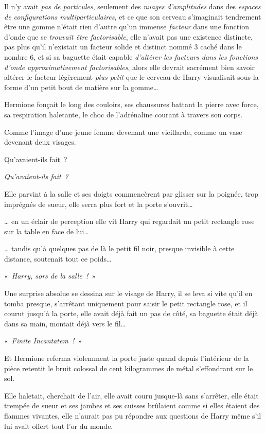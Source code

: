 Il n'y avait \emph{pas de particules}, seulement des \emph{nuages d'amplitudes} dans des \emph{espaces de configurations multiparticulaires}, et ce que son cerveau s'imaginait tendrement être une gomme n'était rien d'autre qu'un immense \emph{facteur} dans une fonction d'onde que se \emph{trouvait être factorisable}, elle n'avait pas une existence distincte, pas plus qu'il n'existait un facteur solide et distinct nommé 3 caché dans le nombre 6, et si sa baguette était capable \emph{d'altérer les facteurs dans les fonctions d'onde approximativement factorisables}, alors elle devrait sacrément bien savoir altérer le facteur légèrement \emph{plus petit} que le cerveau de Harry visualisait sous la forme d'un petit bout de matière sur la gomme…

\later

Hermione fonçait le long des couloirs, ses chaussures battant la pierre avec force, sa respiration haletante, le choc de l'adrénaline courant à travers son corps.

Comme l'image d'une jeune femme devenant une vieillarde, comme un vase devenant deux visages.

Qu'avaient-ils fait~?

\emph{Qu'avaient-ils fait~?}

Elle parvint à la salle et ses doigts commencèrent par glisser sur la poignée, trop imprégnés de sueur, elle serra plus fort et la porte s'ouvrit…

… en un éclair de perception elle vit Harry qui regardait un petit rectangle rose sur la table en face de lui…

… tandis qu'à quelques pas de là le petit fil noir, presque invisible à cette distance, soutenait tout ce poids…

«~\emph{Harry, sors de la salle~!}~»

Une surprise absolue se dessina sur le visage de Harry, il se leva si vite qu'il en tomba presque, s'arrêtant uniquement pour saisir le petit rectangle rose, et il courut jusqu'à la porte, elle avait déjà fait un pas de côté, sa baguette était déjà dans sa main, montait déjà vers le fil…

«~\emph{Finite Incantatem~!}~»

Et Hermione referma violemment la porte juste quand depuis l'intérieur de la pièce retentit le bruit colossal de cent kilogrammes de métal s'effondrant sur le sol.

Elle haletait, cherchait de l'air, elle avait couru jusque-là sans s'arrêter, elle était trempée de sueur et ses jambes et ses cuisses brûlaient comme si elles étaient des flammes vivantes, elle n'aurait pas pu répondre aux questions de Harry même s'il lui avait offert tout l'or du monde.

